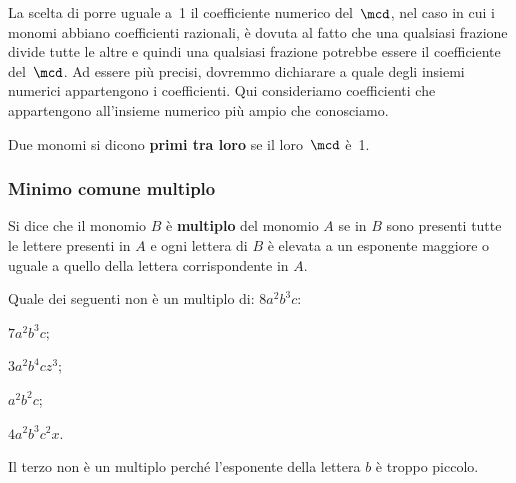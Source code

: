 \begin{osservazione}{}{} 
La scelta di porre uguale a~1 il coefficiente 
numerico del~\(\mcd\), nel
caso in cui i monomi abbiano coefficienti razionali, è dovuta al
fatto che una qualsiasi frazione divide tutte le altre e quindi una
qualsiasi frazione potrebbe essere il coefficiente del~\(\mcd\).
Ad essere più precisi, dovremmo dichiarare a quale degli insiemi 
numerici appartengono i coefficienti. 
Qui consideriamo coefficienti che appartengono all'insieme numerico 
più ampio che conosciamo.
\end{osservazione}


\begin{definizione}{}{}
Due monomi si dicono \textbf{primi tra loro}
 se il loro~\(\mcd\) è~1.
\end{definizione}

\subsubsection{Minimo comune multiplo}

\begin{definizione}{}{}
Si dice che il monomio \(B\) è \textbf{multiplo} del monomio \(A\) se in 
\(B\) sono presenti tutte le lettere presenti in \(A\) e ogni 
lettera di \(B\) è elevata a un esponente maggiore o uguale a quello della 
lettera corrispondente in \(A\). 
\end{definizione}

\begin{esempio}{}{}
Quale dei seguenti non è un multiplo di: \({8a^{2}b^{3}c}\): 

\begin{enumerate*}
\item \({7a^{2}b^{3}c}\); \qquad~
\item \({3a^{2}b^{4}cz^{3}}\); \qquad~
\item \({a^{2}b^{2}c}\); \qquad~
\item \({4a^{2}b^{3}c^{2}x}\).
\end{enumerate*}

Il terzo non è un multiplo perché l'esponente della lettera \(b\) è 
troppo piccolo. 
\end{esempio}


